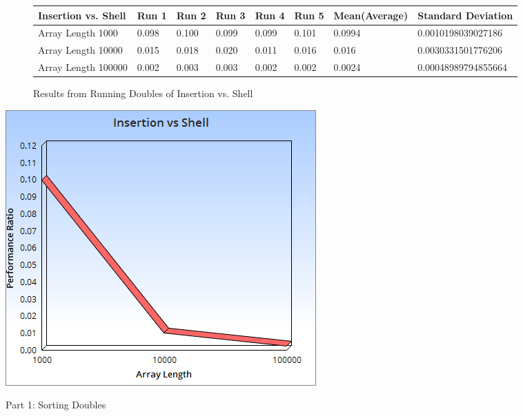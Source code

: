 \documentclass{article}
\begin{document}
\begin{figure}[H]
\centering
\begin{adjustwidth}{-3.4cm}{}
\begin{tabular}{| l | l | l | l | l | l | l | l |}
\hline
Insertion vs. Shell & Run 1 & Run 2 & Run 3 & Run 4 & Run 5 & Mean(Average) & Standard Deviation\\ \hline
Array Length 1000 & 0.098 & 0.100 & 0.099  & 0.099  & 0.101  & 0.0994 &
0.0010198039027186  \\ \hline
Array Length 10000 & 0.015 & 0.018 & 0.020 & 0.011 & 0.016  & 0.016 & 0.0030331501776206 \\ \hline
Array Length 100000 &0.002  & 0.003  & 0.003 & 0.002 & 0.002  & 0.0024 & 0.00048989794855664  \\ \hline
\end{tabular}
\caption{Results from Running Doubles of Insertion vs. Shell}
\end{adjustwidth}
\end{figure}
\includegraphics[scale=0.5]{Doubles2.png}
\begin{center}
Part 1: Sorting Doubles
\end{center}
\end{document}
